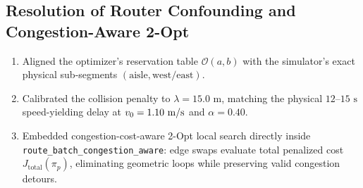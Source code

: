 \documentclass[11pt,a4paper]{article}
\begin{document}
\subsection{Resolution of Router Confounding and Congestion-Aware 2-Opt}
\begin{enumerate}[leftmargin=*]
    \item Aligned the optimizer's reservation table $\mathcal{O}(a, b)$ with the simulator's exact physical sub-segments $(\text{aisle}, \text{west/east})$.
    \item Calibrated the collision penalty to $\lambda = 15.0\text{ m}$, matching the physical $12\text{--}15\text{ s}$ speed-yielding delay at $v_0 = 1.10\text{ m/s}$ and $\alpha = 0.40$.
    \item Embedded congestion-cost-aware 2-Opt local search directly inside \texttt{route\_batch\_congestion\_aware}: edge swaps evaluate total penalized cost $J_{\text{total}}(\pi_p)$, eliminating geometric loops while preserving valid congestion detours.
\end{enumerate}
\end{document}
